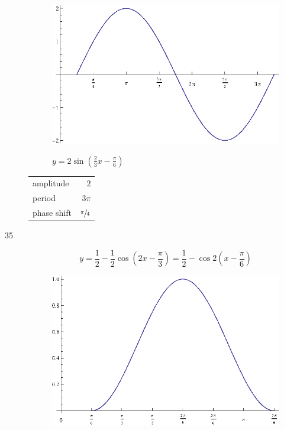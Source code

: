 \documentclass{exam}
\begin{document}
\begin{description}
        \begin{figure}[H]
          \centering
          \includegraphics[scale=1.0]{exercise34.eps}

          $y = 2 \sin \left( \frac{2}{3} x - \frac{\pi}{6} \right)$
        \end{figure}

        \begin{tabular}[H]{lr}
          \toprule
          amplitude   & $2$ \\
          period      & $3 \pi$ \\
          phase shift & $\sfrac{\pi}{4}$ \\
          \bottomrule
        \end{tabular}

      \pagebreak

      \item[35]
        \[
          y = \frac{1}{2} - \frac{1}{2} \cos \left( 2x - \frac{\pi}{3} \right) = \frac{1}{2} - \cos 2 \left( x - \frac{\pi}{6} \right)
        \]

        \begin{figure}[H]
          \centering
          \includegraphics[scale=1.0]{exercise35.eps}


\end{figure}
\end{description}
\end{document}
